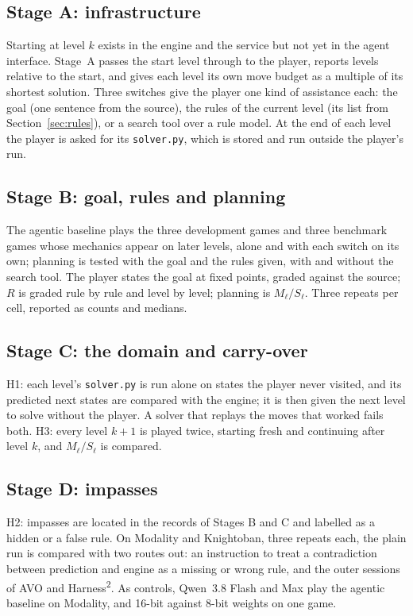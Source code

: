 \documentclass[11pt,a4paper]{article}
\newcommand{\hsq}{Harness\textsuperscript{2}}
\begin{document}
\subsection{Stage A: infrastructure}
Starting at level $k$ exists in the engine and the service but not yet in the
agent interface. Stage~A passes the start level through to the player,
reports levels relative to the start, and gives each level its own move
budget as a multiple of its shortest solution. Three switches give the player
one kind of assistance each: the goal (one sentence from the source), the
rules of the current level (its list from Section~\ref{sec:rules}), or a
search tool over a rule model. At the end of each level the player is asked
for its \texttt{solver.py}, which is stored and run outside the player's run.

\subsection{Stage B: goal, rules and planning}
The agentic baseline plays the three development games and three benchmark
games whose mechanics appear on later levels, alone and with each switch on
its own; planning is tested with the goal and the rules given, with and
without the search tool. The player states the goal at fixed points, graded
against the source; $R$ is graded rule by rule and level by level; planning is
$M_\ell/S_\ell$. Three repeats per cell, reported as counts and medians.

\subsection{Stage C: the domain and carry-over}
H1: each level's \texttt{solver.py} is run alone on states the player never
visited, and its predicted next states are compared with the engine; it is
then given the next level to solve without the player. A solver that replays
the moves that worked fails both. H3: every level $k{+}1$ is played twice,
starting fresh and continuing after level $k$, and $M_\ell/S_\ell$ is compared.

\subsection{Stage D: impasses}
H2: impasses are located in the records of Stages B and C and labelled as a
hidden or a false rule. On Modality and Knightoban, three repeats each, the
plain run is compared with two routes out: an instruction to treat a
contradiction between prediction and engine as a missing or wrong rule, and
the outer sessions of AVO and \hsq{}. As controls, Qwen~3.8 Flash and Max play
the agentic baseline on Modality, and 16-bit against 8-bit weights on one game.
\end{document}
